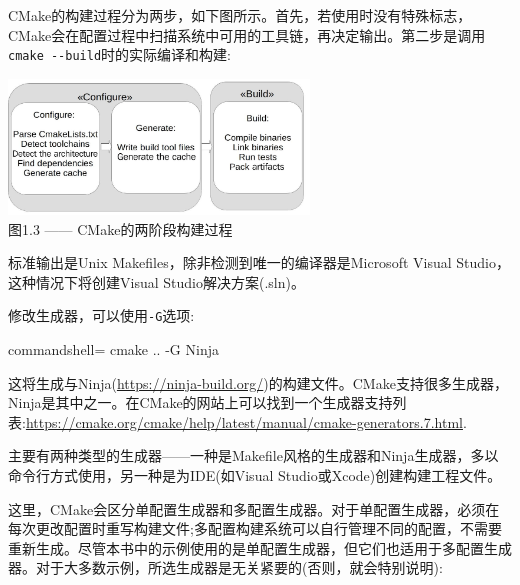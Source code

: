 
CMake的构建过程分为两步，如下图所示。首先，若使用时没有特殊标志，CMake会在配置过程中扫描系统中可用的工具链，再决定输出。第二步是调用\texttt{cmake -{}-build}时的实际编译和构建:

\begin{center}
\includegraphics[width=0.6\textwidth]{content/1/chapter1/images/3.jpg}\\
图1.3 —— CMake的两阶段构建过程
\end{center}

标准输出是Unix Makefiles，除非检测到唯一的编译器是Microsoft Visual Studio，这种情况下将创建Visual Studio解决方案(.sln)。

修改生成器，可以使用\texttt{-G}选项:

\begin{tcblisting}{commandshell={}}
cmake .. -G Ninja
\end{tcblisting}

这将生成与Ninja(\url{https://ninja-build.org/})的构建文件。CMake支持很多生成器，Ninja是其中之一。在CMake的网站上可以找到一个生成器支持列表:\url{https://cmake.org/cmake/help/latest/manual/cmake-generators.7.html}.

主要有两种类型的生成器——一种是Makefile风格的生成器和Ninja生成器，多以命令行方式使用，另一种是为IDE(如Visual Studio或Xcode)创建构建工程文件。

这里，CMake会区分单配置生成器和多配置生成器。对于单配置生成器，必须在每次更改配置时重写构建文件;多配置构建系统可以自行管理不同的配置，不需要重新生成。尽管本书中的示例使用的是单配置生成器，但它们也适用于多配置生成器。对于大多数示例，所选生成器是无关紧要的(否则，就会特别说明):

